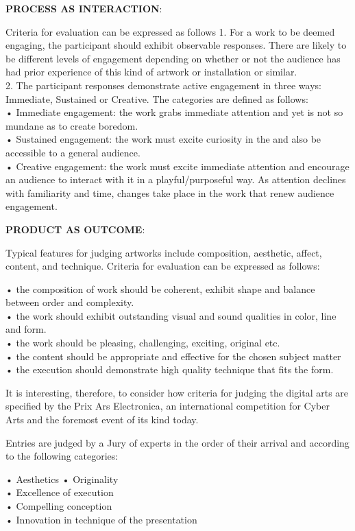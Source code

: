 \textbf{PROCESS AS INTERACTION}: \parencite[p.17]{Candy2012}

Criteria for evaluation can be expressed as follows
1. For a work to be deemed engaging, the participant should exhibit observable responses. There are likely to be different levels of engagement depending on whether or not the audience has had prior experience of this kind of artwork or installation or similar.\\
2. The participant responses demonstrate active engagement in three ways: Immediate, Sustained or Creative. The categories are defined as follows:\\
•	Immediate engagement: the work grabs immediate attention and yet is not so mundane as to create boredom.\\
•	Sustained engagement: the work must excite curiosity in the and also be accessible to a general audience.\\
•	Creative engagement: the work must excite immediate attention and encourage an audience to interact with it in a playful/purposeful way. As attention declines with familiarity and time, changes take place in the work that renew audience engagement.

\textbf{PRODUCT AS OUTCOME}: \parencite[p.18]{Candy2012}

Typical features for judging artworks include composition, aesthetic, affect, content, and technique. Criteria for evaluation can be expressed as follows:

•	the composition of work should be coherent, exhibit shape and balance between order and complexity.\\
•	the work should exhibit outstanding visual and sound qualities in color, line and form.\\
•	the work should be pleasing, challenging, exciting, original etc.\\
•	the content should be appropriate and effective for the chosen subject matter\\
•	the execution should demonstrate high quality technique that fits the form.

It is interesting, therefore, to consider how criteria for judging the digital arts are specified by the Prix Ars Electronica, an international competition for Cyber Arts and the foremost event of its kind today.

Entries are judged by a Jury of experts in the order of their arrival and according to the following categories:

•	Aesthetics • Originality\\
•	Excellence of execution\\
•	Compelling conception\\
•	Innovation in technique of the presentation


